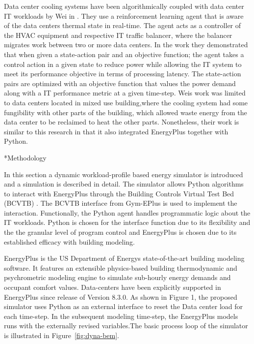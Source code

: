 \documentclass[twocolumn, a4paper,10pt]{article}
\makeatletter
\renewcommand\section{\@startsection{section}{1}{\z@}{0.25cm}{0.1cm}{\normalfont\large\bfseries}}
\makeatother
\begin{document}
Data center cooling systems have been algorithmically coupled with data center IT workloads by Wei in \citep{wei17}. They use a reinforcement learning agent that is aware of the data center\textsc{}s thermal state in real-time. The agent acts as a controller of the HVAC equipment and respective IT traffic balancer, where the balancer migrates work between two or more data centers. In the work they demonstrated that when given a state-action pair and an objective function; the agent takes a control action in a given state to reduce power while allowing the IT system to meet it\textsc{}s performance objective in terms of processing latency. The state-action pairs are optimized with an objective function that values the power demand along with a IT performance metric at a given time-step. Wei\textsc{}s work was limited to data centers located in mixed use building,where the cooling system had some fungibility with other parts of the building, which allowed waste energy from the data center to be reclaimed to heat the other parts. Nonetheless, their work is similar to this research in that it also integrated EnergyPlus together with Python.

\section*{Methodology}

In this section a dynamic workload-profile based energy simulator is introduced and a simulation is described in detail. The simulator allows Python algorithms to interact with EnergyPlus through the Building Controls Virtual Test Bed (BCVTB) \citep{wetter16}. The BCVTB interface from Gym-EPlus \citep{zhang19} is used to implement the interaction. Functionally, the Python agent handles programmatic logic about the IT workloads. Python is chosen for the interface function due to its flexibility and the the granular level of program control and EnergyPlus is chosen due to it\textsc{}s established efficacy with building modeling.

EnergyPlus is the US Department of Energy\textsc{}s state-of-the-art building modeling software. It features an extensible physics-based building thermodynamic and psychrometric modeling engine to simulate sub-hourly energy demands and occupant comfort values. Data-centers have been explicitly supported in EnergyPlus since release of Version 8.3.0. As shown in Figure 1, the proposed simulator uses Python as an external interface to reset the Data center load for each time-step. In the subsequent modeling time-step, the EnergyPlus models runs with the externally revised variables.The basic process loop of the simulator is illustrated in Figure~\ref{fig:dyna-bem}. 
\end{document}
